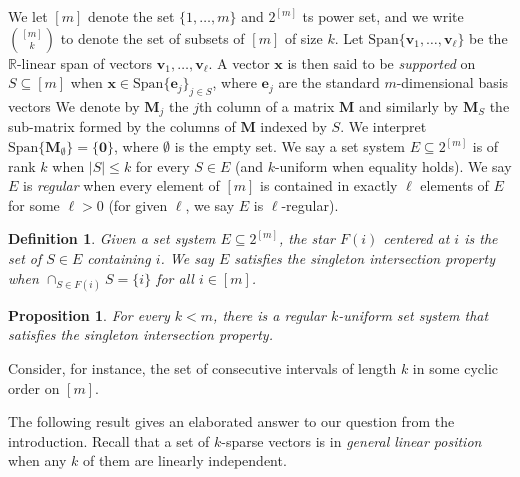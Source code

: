 \documentclass[9pt,twocolumn]{pnas-new}
\newtheorem{proposition}{Proposition}
\newtheorem{definition}{Definition}
\begin{document}
We let $[m]$ denote the set $\{1, \ldots, m\}$ and $2^{[m]}$ ts power set, and we write ${[m] \choose k}$ to denote the set of subsets of $[m]$ of size $k$. Let $\text{Span}\{\mathbf{v}_1, \ldots, \mathbf{v}_\ell\}$ be the $\mathbb{R}$-linear span of vectors $\mathbf{v}_1, \ldots, \mathbf{v}_\ell$. A vector $\mathbf{x}$ is then said to be \emph{supported} on $S \subseteq [m]$ when $\mathbf{x} \in \text{Span} \{\mathbf{e}_j\}_{j\in S}$, where $\mathbf{e}_j$ are the standard $m$-dimensional basis vectors We denote by $\mathbf{M}_j$ the $j$th column of a matrix $\mathbf{M}$ and similarly by $\mathbf{M}_S$ the sub-matrix formed by the columns of $\mathbf{M}$ indexed by $S$. We interpret $\text{Span}\{\mathbf{M}_\emptyset\} = \{\textbf{0}\}$, where $\emptyset$ is the empty set. We say a set system $E \subseteq 2^{[m]}$ is of rank $k$ when $|S| \leq k$ for every $S \in E$ (and $k$-uniform when equality holds). We say $E$ is \emph{regular} when every element of $[m]$ is contained in exactly $\ell$ elements of $E$ for some $\ell > 0$ (for given $\ell$, we say $E$ is $\ell$-regular).

\begin{definition}
Given a set system $E \subseteq 2^{[m]}$, the \emph{star} $F(i)$ centered at $i$ is the set of $S \in E$ containing $i$. We say $E$ satisfies the \emph{singleton intersection property} when $\cap_{S \in F(i)} S = \{i\}$ for all $i \in [m]$. 
\end{definition}

\begin{proposition}
For every $k < m$, there is a regular $k$-uniform set system that satisfies the singleton intersection property.
\end{proposition}
Consider, for instance, the set of consecutive intervals of length $k$ in some cyclic order on $[m]$.

The following result gives an elaborated answer to our question from the introduction. Recall that a set of $k$-sparse vectors is in \emph{general linear position} when any $k$ of them are linearly independent.
\end{document}
